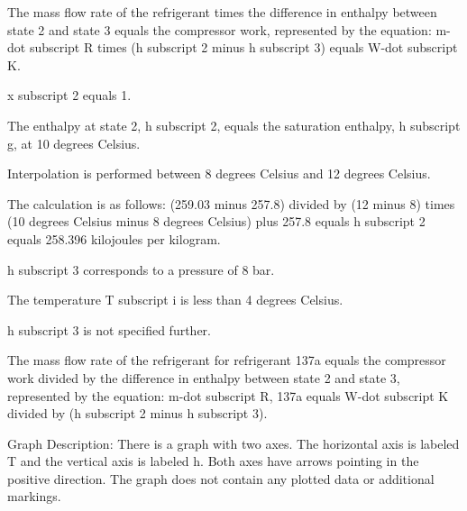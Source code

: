 The mass flow rate of the refrigerant times the difference in enthalpy between state 2 and state 3 equals the compressor work, represented by the equation:
m-dot subscript R times (h subscript 2 minus h subscript 3) equals W-dot subscript K.

x subscript 2 equals 1.

The enthalpy at state 2, h subscript 2, equals the saturation enthalpy, h subscript g, at 10 degrees Celsius.

Interpolation is performed between 8 degrees Celsius and 12 degrees Celsius.

The calculation is as follows: (259.03 minus 257.8) divided by (12 minus 8) times (10 degrees Celsius minus 8 degrees Celsius) plus 257.8 equals h subscript 2 equals 258.396 kilojoules per kilogram.

h subscript 3 corresponds to a pressure of 8 bar.

The temperature T subscript i is less than 4 degrees Celsius.

h subscript 3 is not specified further.

The mass flow rate of the refrigerant for refrigerant 137a equals the compressor work divided by the difference in enthalpy between state 2 and state 3, represented by the equation:
m-dot subscript R, 137a equals W-dot subscript K divided by (h subscript 2 minus h subscript 3).

Graph Description:
There is a graph with two axes. The horizontal axis is labeled T and the vertical axis is labeled h. Both axes have arrows pointing in the positive direction. The graph does not contain any plotted data or additional markings.
